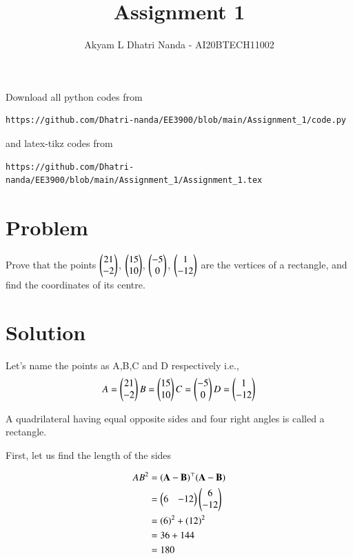 \documentclass[journal,12pt,twocolumn]{IEEEtran}
\begin{document}
     \def\rightbox#1{\makebox[0in][r]{#1}}
     \def\centbox#1{\makebox[0in]{#1}}
     \def\topbox#1{\raisebox{-\baselineskip}[0in][0in]{#1}}
     \def\midbox#1{\raisebox{-0.5\baselineskip}[0in][0in]{#1}}
\vspace{3cm}
\title{Assignment 1}
\author{Akyam L Dhatri Nanda - AI20BTECH11002}
\maketitle
\newpage
\bigskip
\renewcommand{\thefigure}{\theenumi}
\renewcommand{\thetable}{\theenumi}
Download all python codes from 
\begin{lstlisting}
https://github.com/Dhatri-nanda/EE3900/blob/main/Assignment_1/code.py
\end{lstlisting}
%
and latex-tikz codes from 
%
\begin{lstlisting}
https://github.com/Dhatri-nanda/EE3900/blob/main/Assignment_1/Assignment_1.tex
\end{lstlisting}
\section{Problem}
Prove that the points $\begin{pmatrix}21\\-2\end{pmatrix}$, $\begin{pmatrix}15\\10\end{pmatrix}$, $\begin{pmatrix}-5\\0\end{pmatrix}$, $\begin{pmatrix}1\\-12\end{pmatrix}$ are the vertices of a rectangle, and find the coordinates of its centre.

\section{Solution}
Let's name the points as A,B,C and D respectively i.e.,
\begin{align}
A = \begin{pmatrix}21\\-2\end{pmatrix}
B = \begin{pmatrix}15\\10\end{pmatrix}
C = \begin{pmatrix}-5\\0\end{pmatrix}
D = \begin{pmatrix}1\\-12\end{pmatrix}
\end{align}

A quadrilateral having equal opposite sides and four right angles is called a rectangle.

First, let us find the length of the sides

\begin{align}
    AB^2 &= (\mathbf{\mathbf{A} - \mathbf{B}})^\top(\mathbf{\mathbf{A} - \mathbf{B}}) \\
    &=  \begin{pmatrix}6 & -12\end{pmatrix} \begin{pmatrix}6 \\ -12\end{pmatrix}\\
    &= (6)^{2}+ (12)^{2}\\
    &= 36 + 144\\
    &= 180
\end{align}
\end{document}
